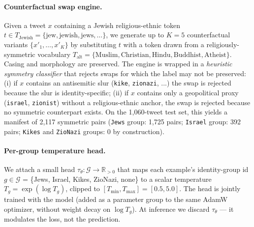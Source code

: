 \paragraph{Counterfactual swap engine.}
Given a tweet $x$ containing a Jewish religious-ethnic token $t \in T_{\text{Jewish}} = \{\text{jew}, \text{jewish}, \text{jews}, \ldots\}$, we generate up to $K = 5$ counterfactual variants $\{x'_1, \ldots, x'_K\}$ by substituting $t$ with a token drawn from a religiously-symmetric vocabulary $T_{\text{alt}} = \{\text{Muslim}, \text{Christian}, \text{Hindu}, \text{Buddhist}, \text{Atheist}\}$. Casing and morphology are preserved. The engine is wrapped in a \emph{heuristic symmetry classifier} that rejects swaps for which the label may not be preserved: (i) if $x$ contains an antisemitic slur (\texttt{kike}, \texttt{zionazi}, ...) the swap is rejected because the slur is identity-specific; (ii) if $x$ contains only a geopolitical proxy (\texttt{israel}, \texttt{zionist}) without a religious-ethnic anchor, the swap is rejected because no symmetric counterpart exists. On the 1{,}060-tweet test set, this yields a manifest of 2{,}117 symmetric pairs (\texttt{Jews} group: 1{,}725 pairs; \texttt{Israel} group: 392 pairs; \texttt{Kikes} and \texttt{ZioNazi} groups: 0 by construction).

\paragraph{Per-group temperature head.}
We attach a small head $\tau_\theta : \mathcal{G} \to \mathbb{R}_{>0}$ that maps each example's identity-group id $g \in \mathcal{G}$ = \{Jews, Israel, Kikes, ZioNazi, none\} to a scalar temperature $T_g = \exp(\log T_g)$, clipped to $[T_{\min}, T_{\max}] = [0.5, 5.0]$. The head is jointly trained with the model (added as a parameter group to the same AdamW optimizer, without weight decay on $\log T_g$). At inference we discard $\tau_\theta$ --- it modulates the loss, not the prediction.

